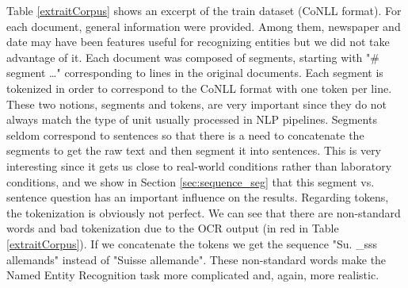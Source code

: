Table \ref{extraitCorpus} shows an excerpt of the train dataset (CoNLL format).
For each document, general information were provided. Among them, newspaper and date may have been features useful for recognizing entities but we did not take advantage of it.
Each document was composed of segments, starting with "\# segment \dots" corresponding to lines in the original documents. Each segment is tokenized in order to correspond to the CoNLL format with one token per line.
These two notions, segments and tokens, are very important since they do not always match the type of unit usually processed in NLP pipelines.
Segments seldom correspond to sentences so that there is a need to concatenate the segments to get the raw text and then segment it into sentences. This is very interesting since it gets us close to real-world conditions rather than laboratory conditions, and we show in Section \ref{sec:sequence_seg} that this segment vs. sentence question has an important influence on the results.
Regarding tokens, the tokenization is obviously not perfect.
We can see that there are non-standard words and bad tokenization due to the OCR output (in red in Table \ref{extraitCorpus}).
If we concatenate the tokens we get the sequence "Su. \_sss allemands" instead of "Suisse allemande". These non-standard words make the Named Entity Recognition task more complicated and, again, more realistic.


